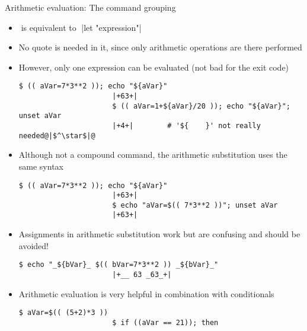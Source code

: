 \begin{frame}[fragile]{Arithmetic evaluation: The command grouping \PB{\texttt{((\ldots))}}}
    \vspace{-1mm}
    \begin{overlayarea}{\textwidth}{0.7\textheight}
        \begin{itemize}
            \item<only@1>  $\;$is  equivalent to$\;$ \bash|let "expression"|
            \item<only@1> No quote is needed in it, since only arithmetic operations are there performed
            \item<only@1> However, only one expression can be evaluated (not bad for the exit code)
                  \begin{lstlisting}[style=MyBash, style=oddnumbers, aboveskip=2mm, belowskip=-6mm]
                      $ (( aVar=7*3**2 )); echo "${aVar}"
                      |+63+|
                      $ (( aVar=1+${aVar}/20 )); echo "${aVar}"; unset aVar
                      |+4+|        # '${    }' not really needed@|$^\star$|@
                  \end{lstlisting}
            \item<only@1> Although not a compound command, the arithmetic substitution uses the same syntax
                  \begin{lstlisting}[style=MyBash, style=oddnumbers, aboveskip=2mm, belowskip=-6mm, firstnumber=4]
                      $ (( aVar=7*3**2 )); echo "${aVar}"
                      |+63+|
                      $ echo "aVar=$(( 7*3**2 ))"; unset aVar
                      |+63+|
                  \end{lstlisting}
            \item<only@1> Assignments in arithmetic substitution work but are confusing and should be avoided!
                  \begin{lstlisting}[style=MyBash, style=oddnumbers, aboveskip=2mm, belowskip=-6mm, firstnumber=8]
                      $ echo "_${bVar}_ $(( bVar=7*3**2 )) _${bVar}_"
                      |+__ 63 _63_+|
                  \end{lstlisting}
            \item<only@2> Arithmetic evaluation is very helpful in combination with conditionals
                  \begin{lstlisting}[style=MyBash, aboveskip=2mm, belowskip=-6mm, firstnumber=11]
                      $ aVar=$(( (5+2)*3 ))
                      $ if ((aVar == 21)); then

\end{lstlisting}
\end{itemize}
\end{overlayarea}
\end{frame}
